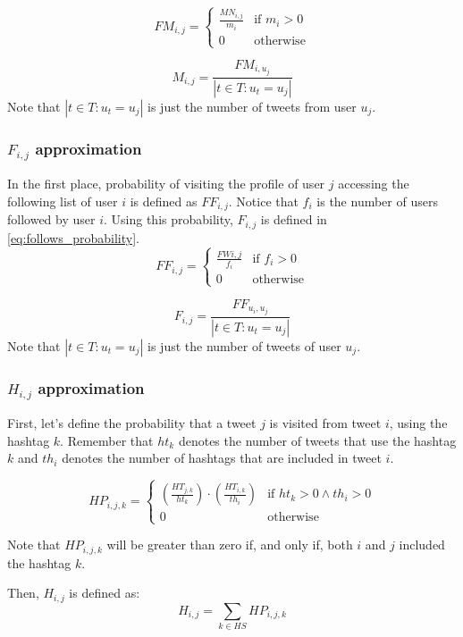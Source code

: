 \begin{equation}
FM_{i,j} = \begin{cases}
\frac{MN_{i,j}}{m_i} & \text{if } m_i > 0 \\
0 & \text{otherwise}
\end{cases}
\end{equation}

\begin{equation}\label{eq:mentions_probability}
M_{i,j} = \frac{FM_{i, u_j}}{ |t \in T : u_t = u_j|}
\end{equation}
Note that $|t \in T : u_t = u_j|$ is just the number of tweets from user $u_j$.

\subsubsection*{$F_{i,j}$ approximation}
In the first place, probability of visiting the profile of user $j$ accessing the following list of user $i$ is defined as $FF_{i,j}$. Notice that $f_i$ is the number of users followed by user $i$. Using this probability, $F_{i,j}$ is defined in \ref{eq:follows_probability}.
\begin{equation}
FF_{i,j} = \begin{cases}
\frac{FW{i,j}}{f_i} & \text{if } f_i > 0 \\
0 & \text{otherwise}
\end{cases}
\end{equation}

\begin{equation}\label{eq:follows_probability}
F_{i,j} = \frac{FF_{u_i, u_j}}{ |t \in T : u_t = u_j|}
\end{equation}
Note that $|t \in T : u_t = u_j|$ is just the number of tweets of user $u_j$.

\subsubsection*{$H_{i,j}$ approximation}
First, let's define the probability that a tweet $j$ is visited from tweet $i$, using the hashtag $k$. Remember that $ht_k$ denotes the number of tweets that use the hashtag $k$ and $th_i$ denotes the number of hashtags that are included in tweet $i$.

\begin{equation}
HP_{i,j,k} = \begin{cases}
\left( \frac{ HT_{j,k} }{ ht_k } \right) \cdot \left( \frac{ HT_{i,k} }{ th_i } \right) & \text{if } ht_k > 0 \wedge th_i > 0 \\
0 & \text{otherwise}
\end{cases}
\end{equation}

Note that $HP_{i,j,k}$ will be greater than zero if, and only if, both $i$ and $j$ included the hashtag $k$. 

Then, $H_{i,j}$ is defined as:
\begin{equation}
H_{i,j} = \sum_{k \in HS} HP_{i,j,k}
\end{equation}

